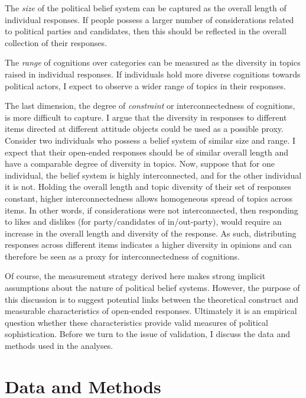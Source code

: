 \documentclass[12pt]{article}
\begin{document}
The \textsl{size} of the political belief system can be captured as the overall length of individual responses. If people possess a larger number of considerations related to political parties and candidates, then this should be reflected in the  overall collection of their responses.

The \textsl{range} of cognitions over categories can be measured as the diversity in topics raised in individual responses. If individuals hold more diverse cognitions towards political actors, I expect to observe a wider range of topics in their responses.

The last dimension, the degree of \textsl{constraint} or interconnectedness of cognitions, is more difficult to capture. I argue that the diversity in responses to different items directed at different attitude objects could be used as a possible proxy. Consider two individuals who possess a belief system of similar size and range. I expect that their open-ended responses should be of similar overall length and have a comparable degree of diversity in topics. Now, suppose that for one individual, the belief system is highly interconnected, and for the other individual it is not. Holding the overall length and topic diversity of their set of responses constant, higher interconnectedness allows homogeneous spread of topics across items. In other words, if considerations were not interconnected, then responding to likes and dislikes (for party/candidates of in/out-party), would require an increase in the overall length and diversity of the response. As such, distributing responses across different items indicates a higher diversity in opinions and can therefore be seen as a proxy for interconnectedness of cognitions.

Of course, the measurement strategy derived here makes strong implicit assumptions about the nature of political belief systems. However, the purpose of this discussion is to suggest potential links between the theoretical construct and measurable characteristics of open-ended responses. Ultimately it is an empirical question whether these characteristics provide valid measures of political sophistication. Before we turn to the issue of validation, I discuss the data and methods used in the analyses.


\section*{Data and Methods}
\end{document}
